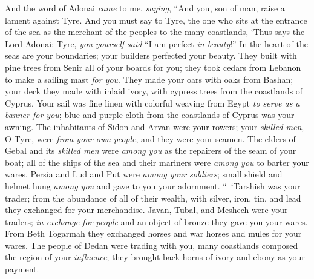 \begin{biblechapter} %
 And the word of Adonai \textit{came} to me, \textit{saying},
\verse “And you, son of man, raise a lament against Tyre.
\verse And you must say to Tyre, the one who sits at the entrance of the sea as the merchant of the peoples to the many coastlands, ‘Thus says the Lord Adonai:
\verse Tyre, \textit{you yourself said} 
“I am perfect \textit{in beauty}!”
\verse In the heart of the seas are your boundaries; 
your builders perfected your beauty.
\verse They built with pine trees from Senir 
all of your boards for you; 
they took cedars from Lebanon 
to make a sailing mast \textit{for you}.
\verse They made your oars 
with oaks from Bashan; 
your deck they made with inlaid ivory, 
with cypress trees from the coastlands of Cyprus.
\verse Your sail was fine linen with colorful weaving from Egypt 
\textit{to serve as a banner for you}; 
blue and purple cloth from the coastlands of Cyprus 
was your awning.
\verse The inhabitants of Sidon and Arvan 
were your rowers; 
your \textit{skilled men}, O Tyre, were \textit{from your own people}, 
and they were your seamen.
\verse The elders of Gebal and its \textit{skilled men} were \textit{among you} 
as the repairers of the seam of your boat; 
all of the ships of the sea and their mariners were \textit{among you} 
to barter your wares.
\verse Persia and Lud and Put 
were \textit{among your soldiers}; 
small shield and helmet hung \textit{among you} 
and gave to you your adornment.
\verse “ ‘Tarshish was your trader; from the abundance of all of their wealth, with silver, iron, tin, and lead they exchanged for your merchandise.
\verse Javan, Tubal, and Meshech were your traders; \textit{in exchange for people} and an object of bronze they gave you your wares.
\verse From Beth Togarmah they exchanged horses and war horses and mules for your wares.
\verse The people of Dedan were trading with you, many coastlands composed the region of your \textit{influence}; they brought back horns of ivory and ebony as your payment.

\end{biblechapter}
